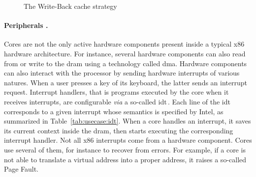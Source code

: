 \begin{figure}

  \caption{The Write-Back cache strategy}
  \label{fig:usecase:writeback}
\end{figure}

\paragraph{Peripherals \IOs.}
%
Cores are not the only active hardware components present inside a typical x86
hardware architecture.
%
For instance, several hardware components can also read from or write to the
\ac{dram} using a technology called \ac{dma}.
%
Hardware components can also interact with the processor by sending hardware
interrupts of various natures.
%
When a user presses a key of its keyboard, the latter sends an interrupt
request.
%
Interrupt handlers, that is programs executed by the core when it receives
interrupts, are configurable \emph{via} a so-called \ac{idt}\,\cite[Volume 3,
Chapter 6]{intel2014manual}.
%
Each line of the \ac{idt} corresponds to a given interrupt whose semantics is
specified by Intel, as summarized in Table~\ref{tab:usecase:idt}.
%
When a core handles an interrupt, it saves its current context inside the
\ac{dram}, then starts executing the corresponding interrupt handler.
%
Not all x86 interrupts come from a hardware component.
%
Cores use several of them, for instance to recover from errors.
%
For example, if a core is not able to translate a virtual address into a proper
address, it raises a so-called Page Fault.

